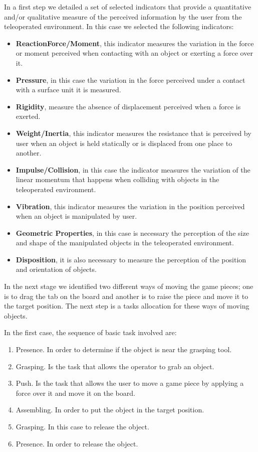 \documentclass[journal,twoside]{JoPhA}
\begin{document}
In a first step we detailed a set of selected indicators that provide a quantitative and/or qualitative measure of the perceived information by the user from the teleoperated environment. In this case we selected the following indicators:
\begin{itemize}
\item \textbf{ReactionForce/Moment}, this indicator measures the variation in the force or moment perceived when contacting with an object or exerting a force over it.
\item \textbf{Pressure}, in this case the variation in the force perceived under a contact with a surface unit it is measured.
\item \textbf{Rigidity}, measure the absence of displacement perceived when a force is exerted. 
\item \textbf{Weight/Inertia}, this indicator measures the resistance that is perceived by user when an object is held statically or is displaced from one place to another.
\item \textbf{Impulse/Collision}, in this case the indicator measures the variation of the linear momentum that happens when colliding with objects in the teleoperated environment.
\item \textbf{Vibration}, this indicator measures the variation in the position perceived when an object is manipulated by user.
\item \textbf{Geometric Properties}, in this case is necessary the perception of the size and shape of the manipulated objects in the teleoperated environment.
\item \textbf{Disposition}, it is also necessary to measure the perception of the position and orientation of objects.
\end{itemize}

In the next stage we identified two different ways of moving the game pieces; one is to drag the tab on the board and another is to raise the piece and move it to the target position. The next step is a tasks allocation for these ways of moving objects. 

In the first case, the sequence of basic task involved are:
\begin{enumerate}
\item Presence. In order to determine if the object is near the grasping tool.
\item Grasping. Is the task that allows the operator to grab an object.
\item Push. Is the task that allows the user to move a game piece by applying a force over it and move it on the board. 
\item Assembling. In order to put the object in the target position.
\item Grasping. In this case to release the object.
\item Presence. In order to release the object.
\end{enumerate}
\end{document}
